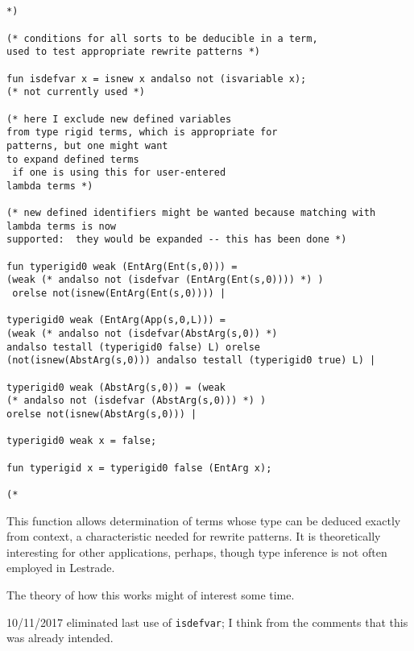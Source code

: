 \documentclass{article}
\begin{document}
\begin{verbatim}


*)

(* conditions for all sorts to be deducible in a term, 
used to test appropriate rewrite patterns *)

fun isdefvar x = isnew x andalso not (isvariable x);  
(* not currently used *)

(* here I exclude new defined variables 
from type rigid terms, which is appropriate for
patterns, but one might want 
to expand defined terms
 if one is using this for user-entered
lambda terms *)

(* new defined identifiers might be wanted because matching with lambda terms is now
supported:  they would be expanded -- this has been done *)

fun typerigid0 weak (EntArg(Ent(s,0))) = 
(weak (* andalso not (isdefvar (EntArg(Ent(s,0)))) *) )
 orelse not(isnew(EntArg(Ent(s,0)))) |

typerigid0 weak (EntArg(App(s,0,L))) =  
(weak (* andalso not (isdefvar(AbstArg(s,0)) *) 
andalso testall (typerigid0 false) L) orelse
(not(isnew(AbstArg(s,0))) andalso testall (typerigid0 true) L) |

typerigid0 weak (AbstArg(s,0)) = (weak 
(* andalso not (isdefvar (AbstArg(s,0))) *) ) 
orelse not(isnew(AbstArg(s,0))) |

typerigid0 weak x = false;

fun typerigid x = typerigid0 false (EntArg x);

(*

\end{verbatim}

This function allows determination of terms whose type can be deduced exactly from context, a characteristic needed for rewrite patterns.  It is theoretically interesting for other applications, perhaps, though type inference is not often employed in Lestrade.

The theory of how this works might of interest some time.

10/11/2017 eliminated last use of {\tt isdefvar}; I think from the comments that this was already intended.
\end{document}
